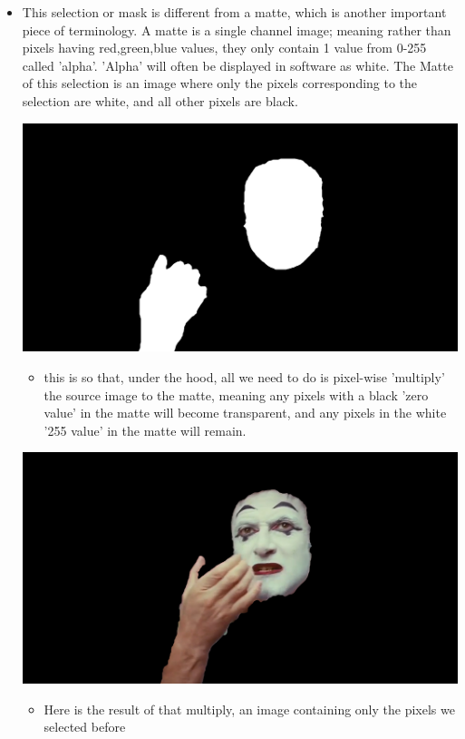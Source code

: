 \documentclass[15pt]{article}
\begin{document}
\begin{itemize}
\item This selection or mask is different from a matte, which is another important
piece of terminology. A matte is a single channel image; meaning rather than
pixels having red,green,blue values, they only contain 1 value from 0-255
called 'alpha'. 'Alpha' will often be displayed in software as white. The
Matte of this selection is an image where only the pixels corresponding to the
selection are white, and all other pixels are black.
\begin{center}
\includegraphics[width=.9\linewidth]{./roto/matte.PNG}
\end{center}
\begin{itemize}
\item this is so that, under the hood, all we need to do is pixel-wise 'multiply' the
source image to the matte, meaning any pixels with a black 'zero value' in
the matte will become transparent, and any pixels in the white '255 value'
in the matte will remain.
\end{itemize}
\begin{center}
\includegraphics[width=.9\linewidth]{./roto/goals.PNG}
\end{center}
\begin{itemize}
\item Here is the result of that multiply, an image containing only the pixels we
selected before
\end{itemize}
\end{itemize}
\end{document}
